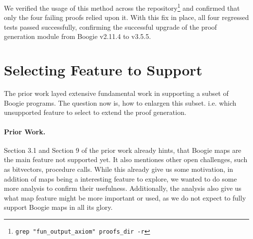\documentclass[11pt]{article}
\begin{document}
We verified the usage of this method across the repository\footnote{\texttt{grep "fun\_output\_axiom" proofs\_dir -r}}
and confirmed that only the four failing proofs relied upon it.
With this fix in place, all four regressed tests passed successfully,
confirming the successful upgrade of the proof generation module from Boogie v2.11.4 to v3.5.5.


\section{Selecting Feature to Support}
\label{sec:unsupported-usage}

The prior work layed extensive fundamental work in supporting a subset of Boogie programs.
The question now is, how to enlargen this subset. i.e. which unsupported feature to select
to extend the proof generation.

\paragraph{Prior Work.} Section 3.1 and Section 9 of the prior work \cite{parthasarathy2021formally} already hints,
that Boogie maps are the main feature not supported yet.
It also mentiones other open challenges, such as bitvectors, procedure calls.
While this already give us some motivation, in addition of maps being a interesting feature to explore,
we wanted to do some more analysis to confirm their usefulness.
Additionally, the analysis also give us what map feature might be more important or used,
as we do not expect to fully support Boogie maps in all its glory.


\end{document}
